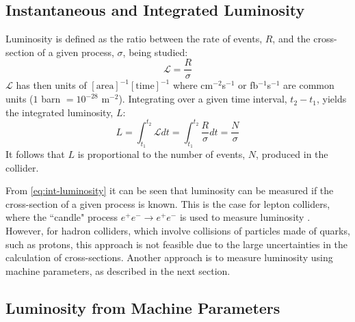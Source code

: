 \subsection{Instantaneous and Integrated Luminosity}

Luminosity is defined as the ratio between the rate of events, $R$, and the cross-section of a given process, $\sigma$, being studied:
\begin{equation}
    \label{eq:inst-luminosity}
    \mathcal{L} = \frac{R}{\sigma}
\end{equation}
$\mathcal{L}$ has then units of $[\mathrm{area}]^{-1} [\mathrm{time}]^{-1}$ where cm$^{-2}$s$^{-1}$ or fb$^{-1}$s$^{-1}$ are common units ($1$ barn  $= 10^{-28}$ m$^{-2}$). Integrating over a given time interval, $t_2 - t_1$, yields the integrated luminosity, $L$:
\begin{equation}
    \label{eq:int-luminosity}
    L = \int_{t_1}^{t_2} \mathcal{L} dt = \int_{t_1}^{t_2} \frac{R}{\sigma} dt = \frac{N}{\sigma}
\end{equation}
It follows that $L$ is proportional to the number of events, $N$, produced in the collider.

From \autoref{eq:int-luminosity} it can be seen that luminosity can be measured if the cross-section of a given process is known. This is the case for lepton colliders, where the ``candle" process $e^+ e^- \rightarrow e^+ e^-$ is used to measure luminosity \cite{Burkhardt:1056691}. However, for hadron colliders, which involve collisions of particles made of quarks, such as protons, this approach is not feasible due to the large uncertainties in the calculation of cross-sections. Another approach is to measure luminosity using machine parameters, as described in the next section.

\subsection{Luminosity from Machine Parameters}
\label{subsec:luminosity_from_machine_parameters}

